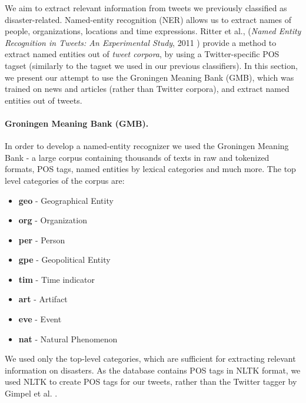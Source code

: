 \documentclass[letterpaper,twocolumn,10pt]{article}
\begin{document}
We aim to extract relevant information from tweets we previously classified as disaster-related. Named-entity recognition (NER) allows us to extract names of people, organizations, locations and time expressions. Ritter et al., (\textit{Named Entity Recognition in Tweets: An Experimental Study}, 2011 \cite{Ritter11}) provide a method to extract named entities out of \textit{tweet corpora}, by using a Twitter-specific POS tagset (similarly to the tagset we used in our previous classifiers). In this section, we present our attempt to use the Groningen Meaning Bank (GMB), which was trained on news and articles (rather than Twitter corpora), and extract named entities out of tweets.

\paragraph{Groningen Meaning Bank (GMB).}
In order to develop a named-entity recognizer we used the Groningen Meaning Bank - a large corpus containing thousands of texts in raw and tokenized formats, POS tags, named entities by lexical categories and much more. The top level categories of the corpus are:

\begin{itemize}[noitemsep, nolistsep]
	\item \textbf{geo} - Geographical Entity
	\item \textbf{org} - Organization
	\item \textbf{per} - Person
	\item \textbf{gpe} - Geopolitical Entity
	\item \textbf{tim} - Time indicator
	\item \textbf{art} - Artifact
	\item \textbf{eve} - Event
	\item \textbf{nat} - Natural Phenomenon
\end{itemize}

We used only the top-level categories, which are sufficient for extracting relevant information on disasters. As the database contains POS tags in NLTK format, we used NLTK to create POS tags for our tweets, rather than the Twitter tagger by Gimpel et al. \cite{POS-Tagging}.
\end{document}
